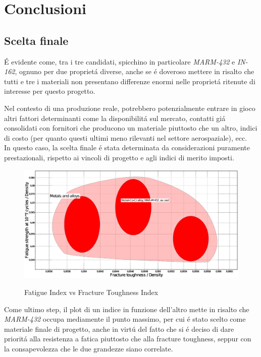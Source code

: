 \documentclass{article}
\begin{document}
        \clearpage


    \section{Conclusioni\label{conclusioni}}

    \subsection{Scelta finale \label{scelta_finale}}

    É evidente come, tra i tre candidati, spicchino  in particolare \textit{MARM-432} e \textit{IN-162}, 
    ognuno per due proprietá diverse, anche se é doveroso mettere in risalto che tutti e tre i materiali
    non presentano differenze enormi nelle proprietá ritenute di interesse per questo progetto.
    
    Nel contesto di una produzione reale, potrebbero potenzialmente entrare in gioco altri fattori determinanti come
    la disponibilitá sul mercato, contatti giá consolidati con fornitori che producono un materiale piuttosto 
    che un altro, indici di costo (per quanto questi ultimi meno rilevanti nel settore aerospaziale), ecc. \\ 

    In questo caso, la scelta finale é stata determinata da considerazioni puramente prestazionali, rispetto 
    ai vincoli di progetto e agli indici di merito imposti. 

        \begin{figure}[h!]
             \label{fig:indici_di_merito}
            \includegraphics[width=\textwidth]{indici.eps}
            \caption{Fatigue Index vs Fracture Toughness Index}
        \end{figure}

        Come ultimo step, il plot di un indice in funzione dell'altro mette in risalto che \textit{MARM-432}
        occupa mediamente il punto massimo, per cui é stato scelto come materiale finale di progetto, 
        anche in virtú del fatto che si é deciso di dare prioritá alla resistenza a fatica piuttosto che 
        alla fracture toughness, seppur con la consapevolezza che le due grandezze siano correlate.
\end{document}
